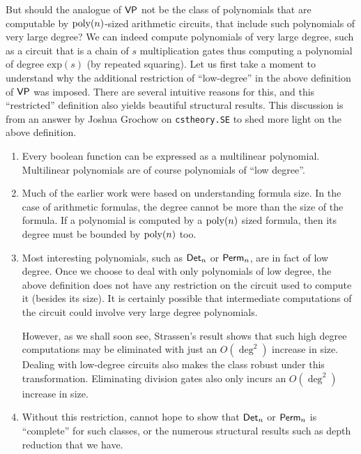 But should the analogue of $\mathsf{VP}$ not be the class of polynomials that are computable by $\operatorname{poly}(n)$-sized arithmetic circuits, that include such polynomials of very large degree? 
We can indeed compute polynomials of very large degree, such as a circuit that is a chain of $s$ multiplication gates thus computing a polynomial of degree $\mathrm{exp}(s)$ (by repeated squaring). 
Let us first take a moment to understand why the additional restriction of ``low-degree'' in the above definition of $\mathsf{VP}$ was imposed. 
There are several intuitive reasons for this, and this ``restricted'' definition also yields beautiful structural results. 
This discussion is from an answer by Joshua Grochow on \texttt{cstheory.SE} \cite{gro:SE} to shed more light on the above definition. 

\begin{enumerate}

\item Every boolean function can be expressed as a multilinear polynomial. 
Multilinear polynomials are of course polynomials of ``low degree''. 

\item Much of the earlier work were based on understanding formula size. 
In the case of arithmetic formulas, the degree cannot be more than the size of the formula. 
If a polynomial is computed by a $\operatorname{poly}(n)$ sized formula, then its degree must be bounded by $\operatorname{poly}(n)$ too. 

\item Most interesting polynomials, such as $\operatorname{\mathsf{Det}}_n$ or $\operatorname{\mathsf{Perm}}_n$, are in fact of low degree. 
Once we choose to deal with only polynomials of low degree, the above definition does not have any restriction on the circuit used to compute it (besides its size). 
It is certainly possible that intermediate computations of the circuit could involve very large degree polynomials. 

However, as we shall soon see, Strassen's result shows that such high degree computations may be eliminated with just an $O(\deg^2)$ increase in size. 
Dealing with low-degree circuits also makes the class robust under this transformation. 
Eliminating division gates also only incurs an $O(\deg^2)$ increase in size. 

\item Without this restriction, cannot hope to show that $\operatorname{\mathsf{Det}}_n$ or $\operatorname{\mathsf{Perm}}_n$ is ``complete'' for such classes, or the numerous structural results such as depth reduction that we have. 

\end{enumerate}

